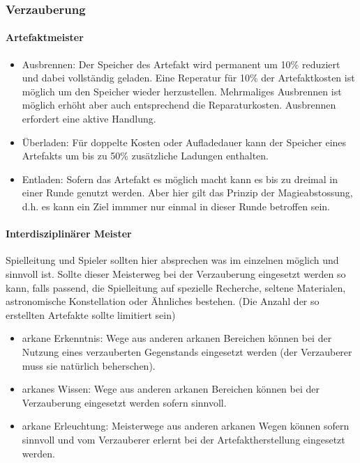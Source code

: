 \documentclass{article}
\begin{document}
\subsubsection{Verzauberung}

\paragraph{Artefaktmeister}

\begin{itemize}
\item Ausbrennen: Der Speicher des Artefakt wird permanent um 10\% reduziert und dabei vollständig geladen. Eine Reperatur für 10\% der Artefaktkosten ist möglich um den Speicher wieder herzustellen. Mehrmaliges Ausbrennen ist möglich erhöht aber auch entsprechend die Reparaturkosten. Ausbrennen erfordert eine aktive Handlung.
\item Überladen: Für doppelte Kosten oder Aufladedauer kann der Speicher eines Artefakts um bis zu 50\% zusätzliche Ladungen enthalten.
\item Entladen: Sofern das Artefakt es möglich macht kann es bis zu dreimal in einer Runde genutzt werden. Aber hier gilt das Prinzip der Magieabstossung, d.h. es kann ein Ziel immmer nur einmal in dieser Runde betroffen sein.
\end{itemize}

\paragraph{Interdisziplinärer Meister}

Spielleitung und Spieler sollten hier absprechen was im einzelnen möglich und sinnvoll ist. Sollte dieser Meisterweg
bei der Verzauberung eingesetzt werden so kann, falls passend, die Spielleitung auf spezielle Recherche, seltene
Materialen, astronomische Konstellation oder Ähnliches bestehen. (Die Anzahl der so erstellten Artefakte sollte
limitiert sein)

\begin{itemize}
\item arkane Erkenntnis: Wege aus anderen arkanen Bereichen können bei der Nutzung eines verzauberten Gegenstands eingesetzt werden (der Verzauberer muss sie natürlich beherschen).
\item arkanes Wissen: Wege aus anderen arkanen Bereichen können bei der Verzauberung eingesetzt werden sofern sinnvoll.
\item arkane Erleuchtung: Meisterwege aus anderen arkanen Wegen können sofern sinnvoll und vom Verzauberer erlernt bei der Artefaktherstellung eingesetzt werden.
\end{itemize}
\end{document}
